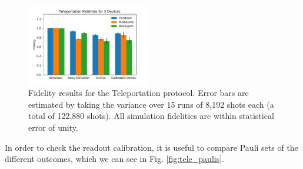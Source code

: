 \begin{figure}[h] \centering
	\includegraphics[width=0.48\textwidth]{images/results/teleport_histogram.pdf}
	\caption{Fidelity results for the Teleportation protocol. Error bars are
		estimated by taking the variance over 15 runs of 8,192 shots each (a total of
		122,880 shots). All simulation fidelities are within statistical error of
		unity.}
	\label{fig:teleport_histogram}
\end{figure}
In order to check the readout calibration, it is useful to compare Pauli sets of
the different outcomes, which we can see in Fig. \ref{fig:tele_paulis}.
